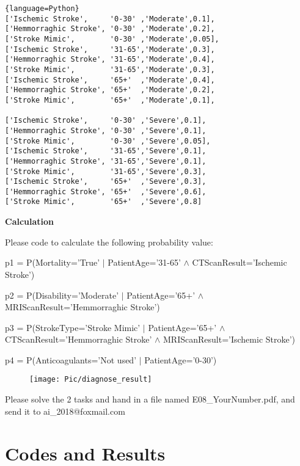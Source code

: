 ﻿\documentclass[a4paper, 11pt]{article}
\begin{document}
\begin{lstlisting}{language=Python}
['Ischemic Stroke',     '0-30' ,'Moderate',0.1],
['Hemmorraghic Stroke', '0-30' ,'Moderate',0.2],
['Stroke Mimic',        '0-30' ,'Moderate',0.05],
['Ischemic Stroke',     '31-65','Moderate',0.3],
['Hemmorraghic Stroke', '31-65','Moderate',0.4],
['Stroke Mimic',        '31-65','Moderate',0.3],
['Ischemic Stroke',     '65+'  ,'Moderate',0.4],
['Hemmorraghic Stroke', '65+'  ,'Moderate',0.2],
['Stroke Mimic',        '65+'  ,'Moderate',0.1],

['Ischemic Stroke',     '0-30' ,'Severe',0.1],
['Hemmorraghic Stroke', '0-30' ,'Severe',0.1],
['Stroke Mimic',        '0-30' ,'Severe',0.05],
['Ischemic Stroke',     '31-65','Severe',0.1],
['Hemmorraghic Stroke', '31-65','Severe',0.1],
['Stroke Mimic',        '31-65','Severe',0.3],
['Ischemic Stroke',     '65+'  ,'Severe',0.3],
['Hemmorraghic Stroke', '65+'  ,'Severe',0.6],
['Stroke Mimic',        '65+'  ,'Severe',0.8]
\end{lstlisting}
\textbf{Calculation}

Please code to calculate the following probability value:

p1 = P(Mortality='True' $|$ PatientAge='31-65' $\land$ CTScanResult='Ischemic Stroke')

p2 = P(Disability='Moderate' $|$ PatientAge='65+' $\land$  MRIScanResult='Hemmorraghic Stroke')

p3 = P(StrokeType='Stroke Mimic' $|$ PatientAge='65+' $\land$ CTScanResult='Hemmorraghic Stroke' $\land$ MRIScanResult='Ischemic Stroke')

p4 = P(Anticoagulants='Not used' $|$ PatientAge='0-30')

\begin{figure}[ht]
\centering
\texttt{[image: Pic/diagnose\_result]}
\end{figure}

Please solve the 2 tasks and hand in a file named \textsf{E08\_YourNumber.pdf}, and send it to \textsf{ai\_2018@foxmail.com}


\section{Codes and Results}


%
%
\end{document}
